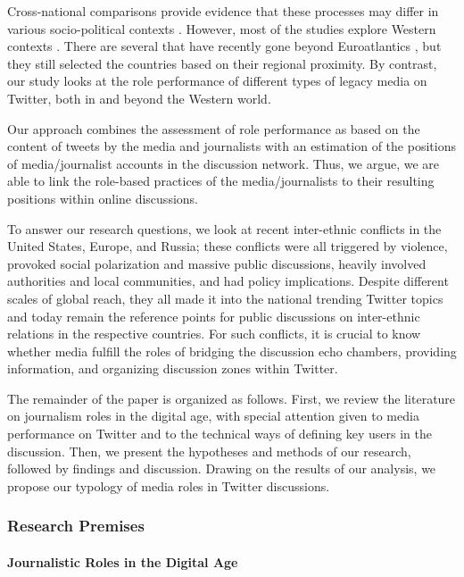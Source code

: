 Cross-national comparisons provide evidence that these processes may differ in various socio-political contexts \cite{HallinMancini2012}. However, most of the studies explore Western contexts \cite{EngesserHumprecht,LarssonKalsnesChristensen}. There are several that have recently gone beyond Euroatlantics \cite{AkohAhiabenu,AlRawi,SaldanaHigginsJoyceSchmitzWeiss}, but they still selected the countries based on their regional proximity. By contrast, our study looks at the role performance of different types of legacy media on Twitter, both in and beyond the Western world.

Our approach combines the assessment of role performance as based on the content of tweets by the media and journalists with an estimation of the positions of media/journalist accounts in the discussion network. Thus, we argue, we are able to link the role-based practices of the media/journalists to their resulting positions within online discussions.

To answer our research questions, we look at recent inter-ethnic conflicts in the United States, Europe, and Russia; these conflicts were all triggered by violence, provoked social polarization and massive public discussions, heavily involved authorities and local communities, and had policy implications. Despite different scales of global reach, they all made it into the national trending Twitter topics and today remain the reference points for public discussions on inter-ethnic relations in the respective countries. For such conflicts, it is crucial to know whether media fulfill the roles of bridging the discussion echo chambers, providing information, and organizing discussion zones within Twitter.

The remainder of the paper is organized as follows. First, we review the literature on journalism roles in the digital age, with special attention given to media performance on Twitter and to the technical ways of defining key users in the discussion. Then, we present the hypotheses and methods of our research, followed by findings and discussion. Drawing on the results of our analysis, we propose our typology of media roles in Twitter discussions.

\subsubsection{Research Premises}

\paragraph{Journalistic Roles in the Digital Age}

